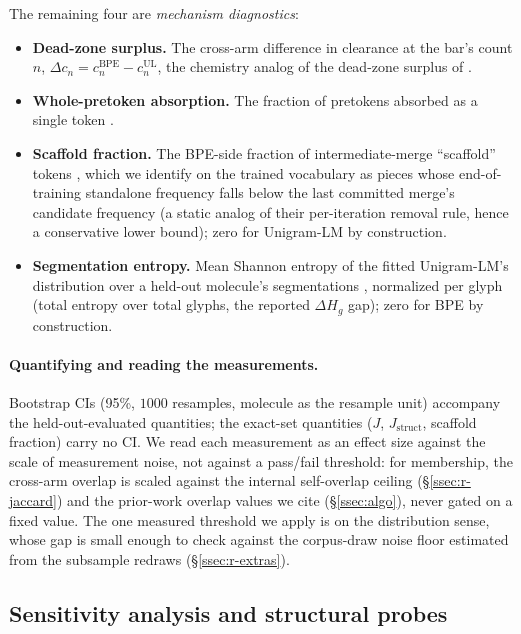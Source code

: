 \documentclass{article}
\begin{document}
\noindent The remaining four are \emph{mechanism diagnostics}:

\begin{itemize}
  \item \textbf{Dead-zone surplus.} The cross-arm difference in clearance at the
    bar's count $n$, $\Delta c_n = c^{\text{BPE}}_n - c^{\text{UL}}_n$, the
    chemistry analog of the dead-zone surplus of
    \citet{bostrom2020bpe-suboptimal}.
  \item \textbf{Whole-pretoken absorption.} The fraction of pretokens
    absorbed as a single token \citep{reddy2025diminishing-tokenization}.
  \item \textbf{Scaffold fraction.} The BPE-side fraction of
    intermediate-merge ``scaffold'' tokens \citep{lian2024scaffold-bpe}, which we
    identify on the trained vocabulary as pieces whose end-of-training
    standalone frequency falls below the last committed merge's candidate
    frequency (a static analog of their per-iteration removal rule, hence a
    conservative lower bound);
    zero for Unigram-LM by construction.
  \item \textbf{Segmentation entropy.} Mean Shannon entropy of the fitted
    Unigram-LM's distribution over a held-out molecule's segmentations
    \citep{kudo2018subword-reg}, normalized per glyph (total entropy over total
    glyphs, the reported $\Delta H_g$ gap); zero for BPE by construction.
\end{itemize}

\paragraph{Quantifying and reading the measurements.}
Bootstrap CIs (95\%, $1000$ resamples, molecule as the resample unit)
accompany the held-out-evaluated quantities; the exact-set quantities
($J$, $J_{\mathrm{struct}}$, scaffold fraction) carry no CI. We read each
measurement as an effect size against the scale of measurement noise, not
against a pass/fail threshold: for membership, the cross-arm overlap is scaled
against the internal self-overlap ceiling (\S\ref{ssec:r-jaccard}) and the
prior-work overlap values we cite (\S\ref{ssec:algo}), never gated on a fixed
value. The one measured threshold we apply is on the distribution sense, whose gap
is small enough to check against the corpus-draw noise floor estimated from the
subsample redraws (\S\ref{ssec:r-extras}).

\subsection{Sensitivity analysis and structural probes}\label{ssec:sensitivity}
\end{document}
